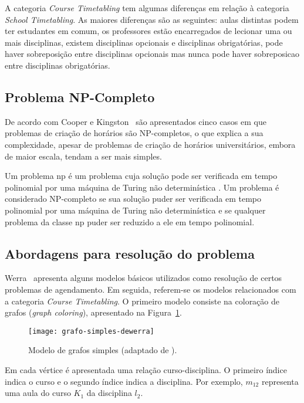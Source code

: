 A categoria \textit{Course Timetabling} tem algumas diferenças em relação à categoria \textit{School Timetabling}. As maiores diferenças são as seguintes: aulas distintas podem ter estudantes em comum, os professores estão encarregados de lecionar uma ou mais disciplinas, existem disciplinas opcionais e disciplinas obrigatórias, pode haver sobreposição entre disciplinas opcionais mas nunca pode haver sobreposicao entre disciplinas obrigatórias.

\subsection{Problema NP-Completo}

De acordo com Cooper e Kingston~\cite{complexitytimetableconstruction-Cooper-1996} são apresentados cinco casos em que problemas de criação de horários são NP-completos, o que explica a sua complexidade, apesar de problemas de criação de horários universitários, embora de maior escala, tendam a ser mais simples.

Um problema \gls{np} é um problema cuja solução pode ser verificada em tempo polinomial por uma máquina de Turing não determinística \cite{designanalysiscomputer-Aho-2000}. Um problema é considerado NP-completo se sua solução puder ser verificada em tempo polinomial por uma máquina de Turing não determinística e se qualquer problema da classe \gls{np} puder ser reduzido a ele em tempo polinomial.

\subsection{Abordagens para resolução do problema}

Werra~\cite{introductiontimetabling-Werra-1985} apresenta alguns modelos básicos utilizados como resolução de certos problemas de agendamento. Em seguida, referem-se os modelos relacionados com a categoria \textit{Course Timetabling}. O primeiro modelo consiste na coloração de grafos (\textit{graph coloring}), apresentado na Figura~\ref{fig:grafo-simples-dewerra}.

\begin{figure}[H]
    \centering
    \texttt{[image: grafo-simples-dewerra]}
    \caption{Modelo de grafos simples (adaptado de \cite{introductiontimetabling-Werra-1985}).}
    \label{fig:grafo-simples-dewerra}
\end{figure}

Em cada vértice é apresentada uma relação curso-disciplina. O primeiro índice indica o curso e o segundo índice indica a disciplina. Por exemplo, $m_{12}$ representa uma aula do curso $K_{1}$ da disciplina $l_{2}$.


